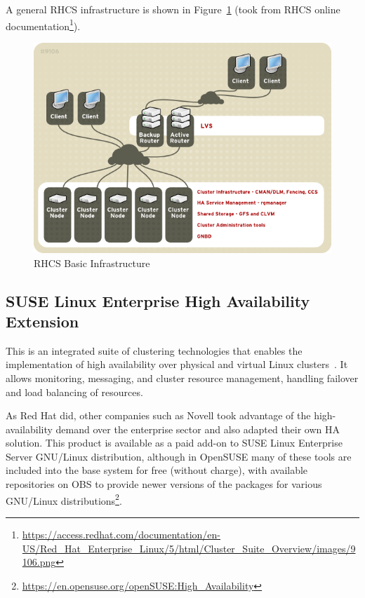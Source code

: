 \documentclass[a4paper, 12pt]{book}
\begin{document}
\noindent A general RHCS infrastructure is shown in Figure~\ref{fig:rhcs} (took from RHCS online documentation\footnote{\url{https://access.redhat.com/documentation/en-US/Red\_Hat\_Enterprise\_Linux/5/html/Cluster\_Suite\_Overview/images/9106.png}}).

\begin{figure}
  \centering
  \includegraphics[scale=0.70]{rhcs.png}
  \caption[RHCS Basic Infrastructure]{RHCS Basic Infrastructure}
  \label{fig:rhcs}
\end{figure}


\subsection{SUSE Linux Enterprise High Availability Extension}
\label{subsec:suseha}

This is an integrated suite of clustering technologies that enables the implementation of high availability over physical and virtual Linux clusters~\cite{TandS}. It allows monitoring, messaging, and cluster resource management, handling failover and load balancing of resources.\bigskip

\noindent As Red Hat did, other companies such as Novell took advantage of the high-availability demand over the enterprise sector and also adapted their own HA solution. This product is available as a paid add-on to SUSE Linux Enterprise Server GNU/Linux distribution, although in OpenSUSE many of these tools are included into the base system for free (without charge), with available repositories on OBS to provide newer versions of the packages for various GNU/Linux distributions\footnote{\url{https://en.opensuse.org/openSUSE:High_Availability}}.\bigskip
\end{document}
